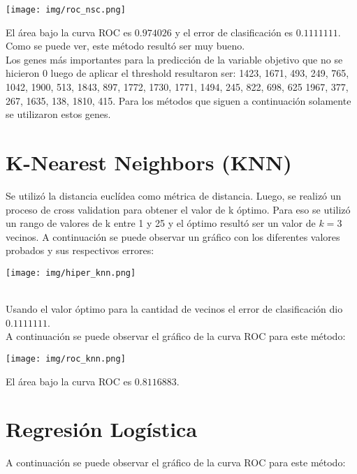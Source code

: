 \documentclass{article}
\begin{document}
\begin{center}
    \texttt{[image: img/roc\_nsc.png]}
\end{center}

\noindent
El área bajo la curva ROC es $0.974026$ y el error de clasificación es $0.1111111$. Como se puede ver, este método resultó ser muy bueno.\\

\noindent
Los genes más importantes para la predicción de la variable objetivo que no se hicieron 0 luego de aplicar el threshold resultaron ser: 1423, 1671, 493, 249, 765, 1042, 1900, 513, 1843, 897, 1772, 1730, 1771, 1494, 245, 822, 698, 625 1967, 377, 267, 1635, 138, 1810, 415. Para los métodos que siguen a continuación solamente se utilizaron estos genes.\\


\section{K-Nearest Neighbors (KNN)}
Se utilizó la distancia euclídea como métrica de distancia. Luego, se realizó un proceso de cross validation para obtener el valor de k óptimo. Para eso se utilizó un rango de valores de k entre 1 y 25 y el óptimo resultó ser un valor de $k=3$ vecinos. A continuación se puede observar un gráfico con los diferentes valores probados y sus respectivos errores:\\

\begin{center}
    \texttt{[image: img/hiper\_knn.png]}
\end{center}\\

\noindent
Usando el valor óptimo para la cantidad de vecinos el error de clasificación dio $0.1111111$.\\

\noindent
A continuación se puede observar el gráfico de la curva ROC para este método:\\

\begin{center}
    \texttt{[image: img/roc\_knn.png]}
\end{center}

\noindent
El área bajo la curva ROC es $0.8116883$.\\


\section{Regresión Logística}
A continuación se puede observar el gráfico de la curva ROC para este método:\\
\end{document}
